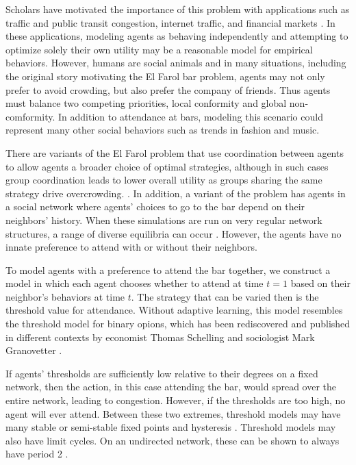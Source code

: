 \documentclass[12pt]{article}
\begin{document}
Scholars have motivated the importance of this problem with applications such as traffic and public transit congestion, internet traffic, and financial markets \cite{zambrano:2004} \cite{chen:2012}.  In these applications, modeling agents as behaving independently and attempting to optimize solely their own utility may be a reasonable model for empirical behaviors.  However, humans are social animals and in many situations, including the original story motivating the El Farol bar problem, agents may not only prefer to avoid crowding, but also prefer the company of friends.  Thus agents must balance two competing priorities, local conformity and global non-comformity.  In addition to attendance at bars, modeling this scenario could represent many other social behaviors such as trends in fashion and music.

There are variants of the El Farol problem that use coordination between agents to allow agents a broader choice of optimal strategies, although in such cases group coordination leads to lower overall utility as groups sharing the same strategy drive overcrowding. \cite{collins:2017} \cite{wilensky:2015}.  In addition, a variant of the problem has agents in a social network where agents' choices to go to the bar depend on their neighbors' history.   When these simulations are run on very regular network structures, a range of diverse equilibria can occur \cite{chen:2012}.  However, the agents have no innate preference to attend with or without their neighbors.

To model agents with a preference to attend the bar together, we construct a model in which each agent chooses whether to attend at time $t = 1$ based on their neighbor's behaviors at time $t$.  The strategy that can be varied then is the threshold value for attendance.  Without adaptive learning, this model resembles the threshold model for binary opions, which has been rediscovered and published in different contexts by economist Thomas Schelling \cite{schelling:1978} and sociologist Mark Granovetter \cite{granovetter:1978} \cite{grabish:2020}.  

If agents' thresholds are sufficiently low relative to their degrees on a fixed network, then the action, in this case attending the bar, would spread over the entire network, leading to congestion.  However, if the thresholds are too high, no agent will ever attend.  Between these two extremes, threshold models may have many stable or semi-stable fixed points \cite{adam:2012} and hysteresis \cite{Wiedermann_2020}.  Threshold models may also have limit cycles.  On an undirected network, these can be shown to always have period 2 \cite{grabish:2020} \cite{goles:1980}.
\end{document}
